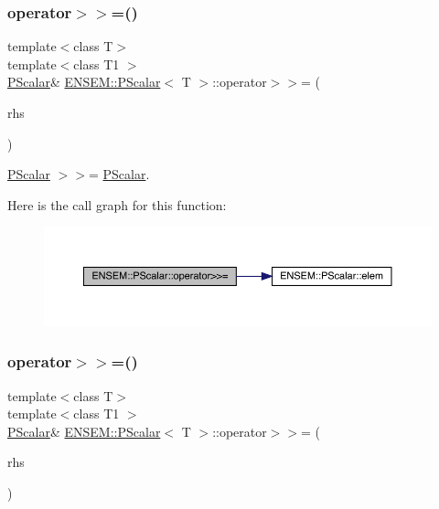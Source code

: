 \subsubsection{\texorpdfstring{operator$>$$>$=()}{operator>>=()}\hspace{0.1cm}{\footnotesize\ttfamily [2/3]}}
{\footnotesize\ttfamily template$<$class T$>$ \\
template$<$class T1 $>$ \\
\mbox{\hyperlink{classENSEM_1_1PScalar}{P\+Scalar}}\& \mbox{\hyperlink{classENSEM_1_1PScalar}{E\+N\+S\+E\+M\+::\+P\+Scalar}}$<$ T $>$\+::operator$>$$>$= (\begin{DoxyParamCaption}\item[{const \mbox{\hyperlink{classENSEM_1_1PScalar}{P\+Scalar}}$<$ T1 $>$ \&}]{rhs }\end{DoxyParamCaption})\hspace{0.3cm}{\ttfamily [inline]}}



\mbox{\hyperlink{classENSEM_1_1PScalar}{P\+Scalar}} $>$$>$= \mbox{\hyperlink{classENSEM_1_1PScalar}{P\+Scalar}}. 

Here is the call graph for this function\+:
\nopagebreak
\begin{figure}[H]
\begin{center}
\leavevmode
\includegraphics[width=350pt]{d3/d27/classENSEM_1_1PScalar_a8fe07cd0462ddff9e3d0858ebe29e77c_cgraph}
\end{center}
\end{figure}
\mbox{\label{classENSEM_1_1PScalar_a8fe07cd0462ddff9e3d0858ebe29e77c}} 
\subsubsection{\texorpdfstring{operator$>$$>$=()}{operator>>=()}\hspace{0.1cm}{\footnotesize\ttfamily [3/3]}}
{\footnotesize\ttfamily template$<$class T$>$ \\
template$<$class T1 $>$ \\
\mbox{\hyperlink{classENSEM_1_1PScalar}{P\+Scalar}}\& \mbox{\hyperlink{classENSEM_1_1PScalar}{E\+N\+S\+E\+M\+::\+P\+Scalar}}$<$ T $>$\+::operator$>$$>$= (\begin{DoxyParamCaption}\item[{const \mbox{\hyperlink{classENSEM_1_1PScalar}{P\+Scalar}}$<$ T1 $>$ \&}]{rhs }\end{DoxyParamCaption})\hspace{0.3cm}{\ttfamily [inline]}}



